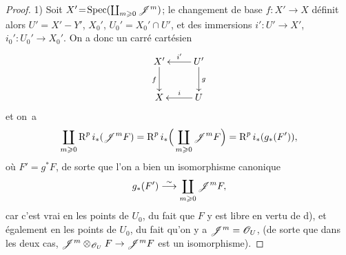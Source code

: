 \begin{proof}
1) Soit $X'\!=\!\operatorname{Spec}(\coprod_{m\geqslant 0}{\mathscr J}^m)$; le changement de base \hbox{$f:X'\!\to\! X$} d\'efinit alors $U'=X'- Y'$, $X_0'$, $U_0'=X_0'\cap U'$, et des immersions $i':U'\to X'$, \hbox{$i_0':U_0'\to X_0'$}. On a donc un carr\'e cart\'esien
\[
\xymatrix{
X^{\prime}\ar[d]_f&U^{\prime}\ar[l]_-{i^{\prime}}\ar[d]^g \\
X&U\ar[l]_-{i}
}
\]
et on~a
\steco
\begin{equation} \label{eq:XII.19}
\coprod_{m\geqslant 0}\operatorname{R}^pi_\ast({\mathscr J}^mF) = \operatorname{R}^pi_\ast \Big(\coprod_{m\geqslant 0} {\mathscr J}^mF \Big) =\operatorname{R}^pi_\ast (g_\ast(F')),
\end{equation}
o\`u $F'=g^\ast F$, de sorte que l'on a bien un isomorphisme canonique
\[
g_\ast(F') \overset{\sim}{\longrightarrow} \coprod_{m\geqslant 0}{\mathscr J}^mF,
\]
car c'est vrai en les points de $U_0$, du fait que $F$ y est libre en vertu de d), et \'egalement en les points de $U_0$, du fait qu'on y a ${\mathscr J}^m={\mathscr O}_U$, (de sorte que dans les deux cas, $\Jj^m\otimes_{\Oo_U}F\to \Jj^mF$ est un isomorphisme).


\end{proof}
